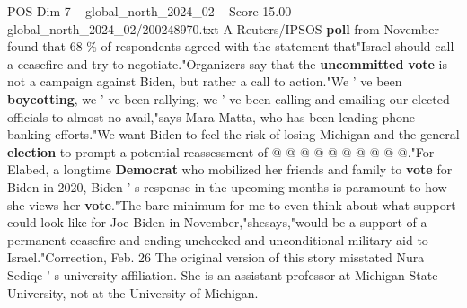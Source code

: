\begin{textsample}{POS Dim 7 – global\_north\_2024\_02 – Score 15.00 – global\_north\_2024\_02/200248970.txt}
A Reuters/IPSOS \textbf{poll} from November found that 68 \% of respondents agreed with the statement that"Israel should call a ceasefire and try to negotiate."Organizers say that the \textbf{uncommitted} \textbf{vote} is not a campaign against Biden, but rather a call to action."We ' ve been \textbf{boycotting}, we ' ve been rallying, we ' ve been calling and emailing our elected officials to almost no avail,"says Mara Matta, who has been leading phone banking efforts."We want Biden to feel the risk of losing Michigan and the general \textbf{election} to prompt a potential reassessment of @ @ @ @ @ @ @ @ @ @."For Elabed, a longtime \textbf{Democrat} who mobilized her friends and family to \textbf{vote} for Biden in 2020, Biden ' s response in the upcoming months is paramount to how she views her \textbf{vote}."The bare minimum for me to even think about what support could look like for Joe Biden in November,"shesays,"would be a support of a permanent ceasefire and ending unchecked and unconditional military aid to Israel."Correction, Feb. 26 The original version of this story misstated Nura Sediqe ' s university affiliation.
She is an assistant professor at Michigan State University, not at the University of Michigan.

\end{textsample}
